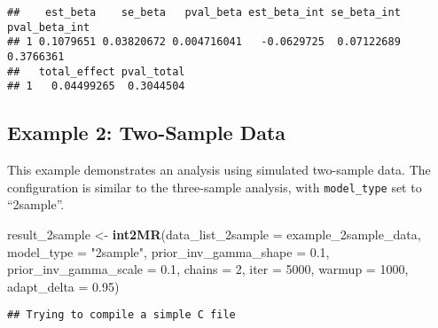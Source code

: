 \documentclass[
]{article}
\newenvironment{Shaded}{\begin{snugshade}}{\end{snugshade}}
\newcommand{\AttributeTok}[1]{\textcolor[rgb]{0.13,0.29,0.53}{#1}}
\newcommand{\DecValTok}[1]{\textcolor[rgb]{0.00,0.00,0.81}{#1}}
\newcommand{\FloatTok}[1]{\textcolor[rgb]{0.00,0.00,0.81}{#1}}
\newcommand{\FunctionTok}[1]{\textcolor[rgb]{0.13,0.29,0.53}{\textbf{#1}}}
\newcommand{\NormalTok}[1]{#1}
\newcommand{\OtherTok}[1]{\textcolor[rgb]{0.56,0.35,0.01}{#1}}
\newcommand{\StringTok}[1]{\textcolor[rgb]{0.31,0.60,0.02}{#1}}
\begin{document}
\begin{verbatim}
##    est_beta    se_beta   pval_beta est_beta_int se_beta_int pval_beta_int
## 1 0.1079651 0.03820672 0.004716041   -0.0629725  0.07122689     0.3766361
##   total_effect pval_total
## 1   0.04499265  0.3044504
\end{verbatim}

\subsection{Example 2: Two-Sample Data}\label{example-2-two-sample-data}

This example demonstrates an analysis using simulated two-sample data.
The configuration is similar to the three-sample analysis, with
\texttt{model\_type} set to ``2sample''.

\begin{Shaded}
\begin{Highlighting}[]
\NormalTok{result\_2sample }\OtherTok{\textless{}{-}} \FunctionTok{int2MR}\NormalTok{(}\AttributeTok{data\_list\_2sample =}\NormalTok{ example\_2sample\_data,}
                 \AttributeTok{model\_type =} \StringTok{"2sample"}\NormalTok{,}
                 \AttributeTok{prior\_inv\_gamma\_shape =} \FloatTok{0.1}\NormalTok{,}
                 \AttributeTok{prior\_inv\_gamma\_scale =} \FloatTok{0.1}\NormalTok{,}
                 \AttributeTok{chains =} \DecValTok{2}\NormalTok{, }\AttributeTok{iter =} \DecValTok{5000}\NormalTok{, }\AttributeTok{warmup =} \DecValTok{1000}\NormalTok{,}
                 \AttributeTok{adapt\_delta =} \FloatTok{0.95}\NormalTok{)}
\end{Highlighting}
\end{Shaded}

\begin{verbatim}
## Trying to compile a simple C file
\end{verbatim}
\end{document}
